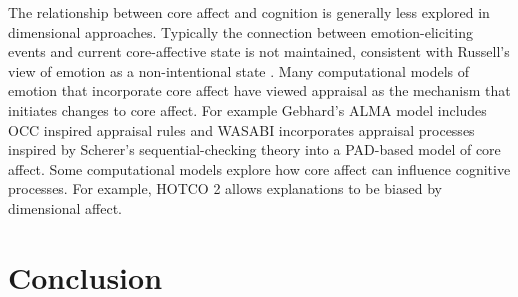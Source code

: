 \documentclass[11pt]{article}
\begin{document}
The relationship between core affect and cognition is generally less explored in
dimensional approaches. Typically the connection between emotion-eliciting
events and current core-affective state is not maintained, consistent with
Russell’s view of emotion as a non-intentional state
\cite{becker:affect-primary-secondary}. Many computational models of emotion
that incorporate core affect have viewed appraisal as the mechanism that
initiates changes to core affect. For example Gebhard’s ALMA model
\cite{gebhard:alma} includes OCC inspired appraisal rules \cite{occ:structure}
and WASABI \cite{becker:wasabi} incorporates appraisal processes inspired by
Scherer’s sequential-checking theory into a PAD-based model of core affect. Some
computational models explore how core affect can influence cognitive processes.
For example, HOTCO 2 \cite{thagard:emotional-coherence} allows explanations to
be biased by dimensional affect.

\section{Conclusion}
\label{sec:conclusion}



\end{document}
